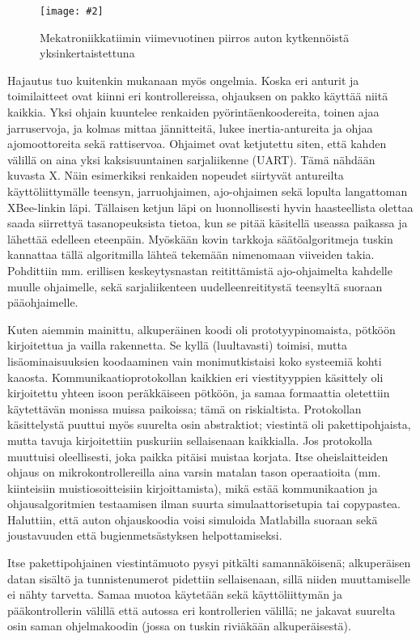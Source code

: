 \documentclass{article}
\newcommand{\kuvaa}[4]{%
	\begin{figure}[h]%
		\centering \texttt{[image: \#2]}%
		\caption{#3 \label{fig:#4}}%
	\end{figure}%
}
\begin{document}
\kuvaa{0.8}{elektroniikka}{Mekatroniikkatiimin viimevuotinen piirros auton kytkennöistä yksinkertaistettuna}{elektroniikka}

Hajautus tuo kuitenkin mukanaan myös ongelmia. Koska eri anturit ja toimilaitteet ovat kiinni eri kontrollereissa, ohjauksen on pakko käyttää niitä kaikkia. Yksi ohjain kuuntelee renkaiden pyörintäenkoodereita, toinen ajaa jarruservoja, ja kolmas mittaa jännitteitä, lukee inertia-antureita ja ohjaa ajomoottoreita sekä rattiservoa. Ohjaimet ovat ketjutettu siten, että kahden välillä on aina yksi kaksisuuntainen sarjaliikenne (UART). Tämä nähdään kuvasta X. Näin esimerkiksi renkaiden nopeudet siirtyvät antureilta käyttöliittymälle teensyn, jarruohjaimen, ajo-ohjaimen sekä lopulta langattoman XBee-linkin läpi. Tällaisen ketjun läpi on luonnollisesti hyvin haasteellista olettaa saada siirrettyä tasanopeuksista tietoa, kun se pitää käsitellä useassa paikassa ja lähettää edelleen eteenpäin. Myöskään kovin tarkkoja säätöalgoritmeja tuskin kannattaa tällä algoritmilla lähteä tekemään nimenomaan viiveiden takia. Pohdittiin mm. erillisen keskeytysnastan reitittämistä ajo-ohjaimelta kahdelle muulle ohjaimelle, sekä sarjaliikenteen uudelleenreititystä teensyltä suoraan pääohjaimelle.

Kuten aiemmin mainittu, alkuperäinen koodi oli prototyypinomaista, pötköön kirjoitettua ja vailla rakennetta. Se kyllä (luultavasti) toimisi, mutta lisäominaisuuksien koodaaminen vain monimutkistaisi koko systeemiä kohti kaaosta. Kommunikaatioprotokollan kaikkien eri viestityyppien käsittely oli kirjoitettu yhteen isoon peräkkäiseen pötköön, ja samaa formaattia oletettiin käytettävän monissa muissa paikoissa; tämä on riskialtista. Protokollan käsittelystä puuttui myös suurelta osin abstraktiot; viestintä oli pakettipohjaista, mutta tavuja kirjoitettiin puskuriin sellaisenaan kaikkialla. Jos protokolla muuttuisi oleellisesti, joka paikka pitäisi muistaa korjata. Itse oheislaitteiden ohjaus on mikrokontrollereilla aina varsin matalan tason operaatioita (mm. kiinteisiin muistiosoitteisiin kirjoittamista), mikä estää kommunikaation ja ohjausalgoritmien testaamisen ilman suurta simulaattorisetupia tai copypastea. Haluttiin, että auton ohjauskoodia voisi simuloida Matlabilla suoraan sekä joustavuuden että bugienmetsästyksen helpottamiseksi.

Itse pakettipohjainen viestintämuoto pysyi pitkälti samannäköisenä; alkuperäisen datan sisältö ja tunnistenumerot pidettiin sellaisenaan, sillä niiden muuttamiselle ei nähty tarvetta. Samaa muotoa käytetään sekä käyttöliittymän ja pääkontrollerin välillä että autossa eri kontrollerien välillä; ne jakavat suurelta osin saman ohjelmakoodin (jossa on tuskin riviäkään alkuperäisestä).
\end{document}
